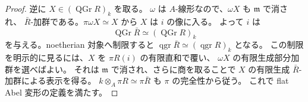 \begin{proof}
逆に $X\in(\operatorname{QGr}R)_k$ を取る。
$\omega$ は $A$-線形なので、$\omega X$ も $\mathfrak m$ で消され、
$\bar R$-加群である。$\pi\omega X\simeq X$ から $X$ は $i$ の像に入る。
よって $i$ は
\[
 \operatorname{QGr}\bar R\simeq(\operatorname{QGr}R)_k
\]
を与える。noetherian 対象へ制限すると
$\operatorname{qgr}\bar R\simeq(\operatorname{qgr}R)_k$ となる。
この制限を明示的に見るには、$X$ を $\pi R(i)$ の有限直和で覆い、
$\omega X$ の有限生成部分加群を選べばよい。
それは $\mathfrak m$ で消され、さらに商を取ることで $X$ の有限生成
$\bar R$-加群による表示を得る。
$k\otimes_A\pi R\simeq\pi\bar R$ も $\pi$ の完全性から従う。
これで flat Abel 変形の定義を満たす。
\end{proof}
